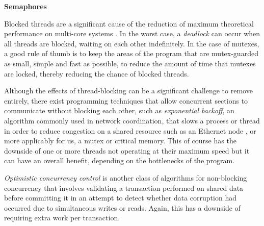 \documentclass[11pt, a4paper, twocolumn]{article}
\begin{document}

\textbf{Semaphores}

Blocked threads are a significant cause of the reduction of maximum theoretical performance on multi-core systems \citep{Alemany1992}. In the worst case, a \emph{deadlock} can occur when all threads are blocked, waiting on each other indefinitely. In the case of mutexes, a good rule of thumb is to keep the areas of the program that are mutex-guarded as small, simple and fast as possible, to reduce the amount of time that mutexes are locked, thereby reducing the chance of blocked threads.

Although the effects of thread-blocking can be a significant challenge to remove entirely, there exist programming techniques that allow concurrent sections to communicate without blocking each other, such as \emph{exponential backoff}, an algorithm commonly used in network coordination, that slows a process or thread in order to reduce congestion on a shared resource such as an Ethernet node \citep{Goodman2019}, or more applicably for us, a mutex or critical memory. This of course has the downside of one or more threads not operating at their maximum speed but it can have an overall benefit, depending on the bottlenecks of the program.

\emph{Optimistic concurrency control} is another class of algorithms for non-blocking concurrency that involves validating a transaction performed on shared data before committing it \citep{Herlihy1993} in an attempt to detect whether data corruption had occurred due to simultaneous writes or reads. Again, this has a downside of requiring extra work per transaction.


\end{document}
